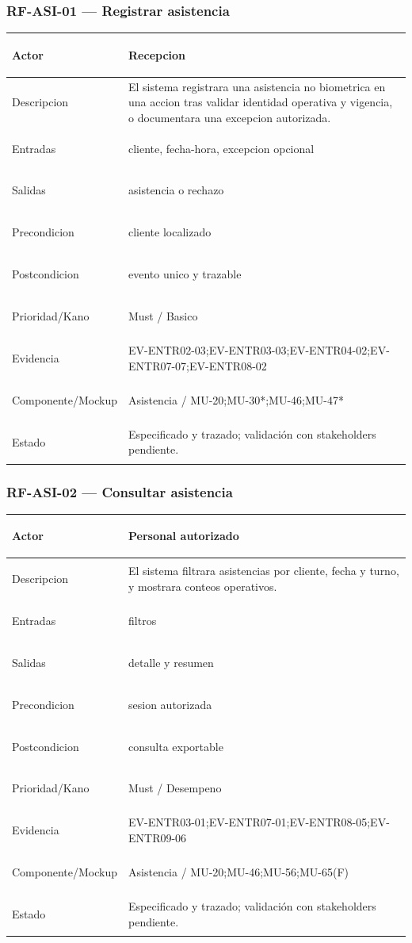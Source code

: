 \documentclass[11pt,a4paper,twoside]{article}
\begin{document}
\subsubsection{RF-ASI-01 — Registrar asistencia}
\begingroup
\renewcommand{\arraystretch}{1.12}
\setlength{\tabcolsep}{5pt}
\begin{tabularx}{\textwidth}{|>{\bfseries\raggedright\arraybackslash}p{3.35cm}|>{\raggedright\arraybackslash}X|}
\hline
Actor & Recepcion \\ \hline
Descripcion & El sistema registrara una asistencia no biometrica en una accion tras validar identidad operativa y vigencia, o documentara una excepcion autorizada. \\ \hline
Entradas & cliente, fecha-hora, excepcion opcional \\ \hline
Salidas & asistencia o rechazo \\ \hline
Precondicion & cliente localizado \\ \hline
Postcondicion & evento unico y trazable \\ \hline
Prioridad/Kano & Must / Basico \\ \hline
Evidencia & EV-ENTR02-03;EV-ENTR03-03;EV-ENTR04-02;EV-ENTR07-07;EV-ENTR08-02 \\ \hline
Componente/Mockup & Asistencia / MU-20;MU-30*;MU-46;MU-47* \\ \hline
Estado & Especificado y trazado; validación con stakeholders pendiente. \\ \hline
\end{tabularx}
\endgroup

\subsubsection{RF-ASI-02 — Consultar asistencia}
\begingroup
\renewcommand{\arraystretch}{1.12}
\setlength{\tabcolsep}{5pt}
\begin{tabularx}{\textwidth}{|>{\bfseries\raggedright\arraybackslash}p{3.35cm}|>{\raggedright\arraybackslash}X|}
\hline
Actor & Personal autorizado \\ \hline
Descripcion & El sistema filtrara asistencias por cliente, fecha y turno, y mostrara conteos operativos. \\ \hline
Entradas & filtros \\ \hline
Salidas & detalle y resumen \\ \hline
Precondicion & sesion autorizada \\ \hline
Postcondicion & consulta exportable \\ \hline
Prioridad/Kano & Must / Desempeno \\ \hline
Evidencia & EV-ENTR03-01;EV-ENTR07-01;EV-ENTR08-05;EV-ENTR09-06 \\ \hline
Componente/Mockup & Asistencia / MU-20;MU-46;MU-56;MU-65(F) \\ \hline
Estado & Especificado y trazado; validación con stakeholders pendiente. \\ \hline
\end{tabularx}
\endgroup
\end{document}
